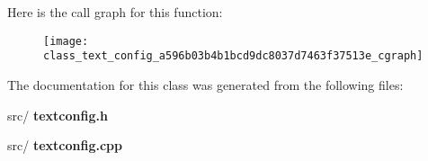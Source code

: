 Here is the call graph for this function\+:\nopagebreak
\begin{figure}[H]
\begin{center}
\leavevmode
\texttt{[image: class\_text\_config\_a596b03b4b1bcd9dc8037d7463f37513e\_cgraph]}
\end{center}
\end{figure}


The documentation for this class was generated from the following files\+:\begin{DoxyCompactItemize}
\item 
src/\textbf{ textconfig.\+h}\item 
src/\textbf{ textconfig.\+cpp}\end{DoxyCompactItemize}
